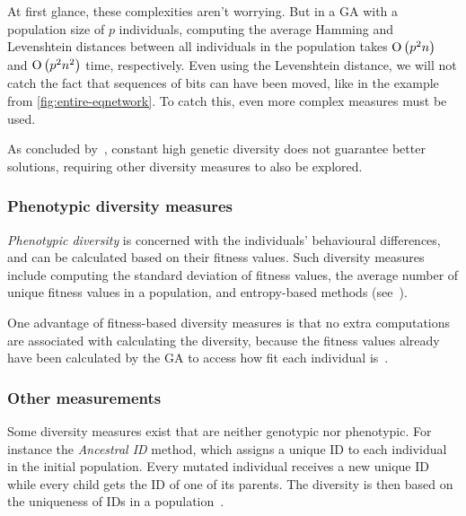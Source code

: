 At first glance, these complexities aren't worrying. But in a GA with a population size of $p$ individuals, computing the average Hamming and Levenshtein distances between all individuals in the population takes $\operatorname{O}\left(p^2 n\right)$ and $\operatorname{O}\left(p^2 n^2\right)$ time, respectively. Even using the Levenshtein distance, we will not catch the fact that sequences of bits can have been moved, like in the example from \cref{fig:entire-eqnetwork}. To catch this, even more complex measures must be used.

As concluded by~\cite{Darwen00doesextra}, constant high genetic diversity does not guarantee better solutions, requiring other diversity measures to also be explored.

\subsubsection{Phenotypic diversity measures}
\emph{Phenotypic diversity} is concerned with the individuals' behavioural differences, and can be calculated based on their fitness values. Such diversity measures include computing the standard deviation of fitness values, the average number of unique fitness values in a population, and entropy-based methods (see~\cite{1250187, 1266373}).

One advantage of fitness-based diversity measures is that no extra computations are associated with calculating the diversity, because the fitness values already have been calculated by the GA to access how fit each individual is~\cite{Nguyen:2006:ASPGP}.

\subsubsection{Other measurements}
Some diversity measures exist that are neither genotypic nor phenotypic. For instance the \emph{Ancestral ID} method, which assigns a unique ID to each individual in the initial population. Every mutated individual receives a new unique ID while every child gets the ID of one of its parents. The diversity is then based on the uniqueness of IDs in a population~\cite{1250187}.


